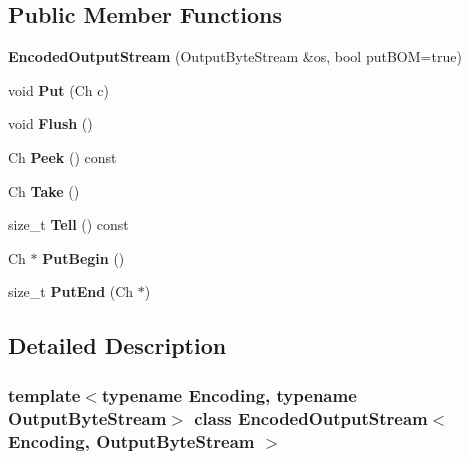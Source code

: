\subsection*{Public Member Functions}
\begin{DoxyCompactItemize}
\item 
\mbox{\label{class_encoded_output_stream_ad3360c613a30a6a15526ae9ad63bd004}} 
{\bfseries Encoded\+Output\+Stream} (Output\+Byte\+Stream \&os, bool put\+B\+OM=true)
\item 
\mbox{\label{class_encoded_output_stream_a0f3c00f94c195a38d78c05ecda497481}} 
void {\bfseries Put} (Ch c)
\item 
\mbox{\label{class_encoded_output_stream_a657188f6a9f0fae01a4012c288d3fd46}} 
void {\bfseries Flush} ()
\item 
\mbox{\label{class_encoded_output_stream_a22e00087e16ad7a12438fb34fb562bb7}} 
Ch {\bfseries Peek} () const
\item 
\mbox{\label{class_encoded_output_stream_a90f5a5e1598316a417ef5b6ad3d49f36}} 
Ch {\bfseries Take} ()
\item 
\mbox{\label{class_encoded_output_stream_a1c6f6d51999b8d04e4d81d92ff725dbc}} 
size\+\_\+t {\bfseries Tell} () const
\item 
\mbox{\label{class_encoded_output_stream_a78934de4f76c9fa65238e65d3630cbc5}} 
Ch $\ast$ {\bfseries Put\+Begin} ()
\item 
\mbox{\label{class_encoded_output_stream_a818695f6d3fa8896e9d7d0fbdc7d4514}} 
size\+\_\+t {\bfseries Put\+End} (Ch $\ast$)
\end{DoxyCompactItemize}


\subsection{Detailed Description}
\subsubsection*{template$<$typename Encoding, typename Output\+Byte\+Stream$>$\newline
class Encoded\+Output\+Stream$<$ Encoding, Output\+Byte\+Stream $>$}

